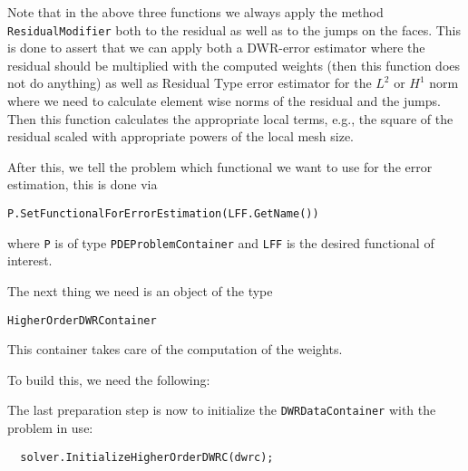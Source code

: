 Note that in the above three functions we always apply the method \texttt{ResidualModifier} both to the 
residual as well as to the jumps on the faces. This is done to assert that we can apply both a 
DWR-error estimator where the residual should be multiplied with the computed weights (then this function 
does not do anything) as well as Residual Type error estimator for the $L^2$ or $H^1$ norm where we need to calculate element wise norms of the residual and the jumps. Then this function calculates the appropriate 
local terms, e.g., the square of the residual scaled with appropriate powers of the local mesh size.



After this, we tell the problem which functional we want to use for the error estimation, this is done via
\begin{verbatim}
P.SetFunctionalForErrorEstimation(LFF.GetName())
\end{verbatim}
where \texttt{P} is of type \texttt{PDEProblemContainer} and \texttt{LFF} is the desired functional of interest. 

The next thing we need is an object of the type
\begin{verbatim}
HigherOrderDWRContainer
\end{verbatim}
This container takes care of the computation of the weights.

To build this, we need the following:
The last preparation step is now to initialize the \texttt{DWRDataContainer} with the problem in use:
\begin{verbatim}
  solver.InitializeHigherOrderDWRC(dwrc);
\end{verbatim}

